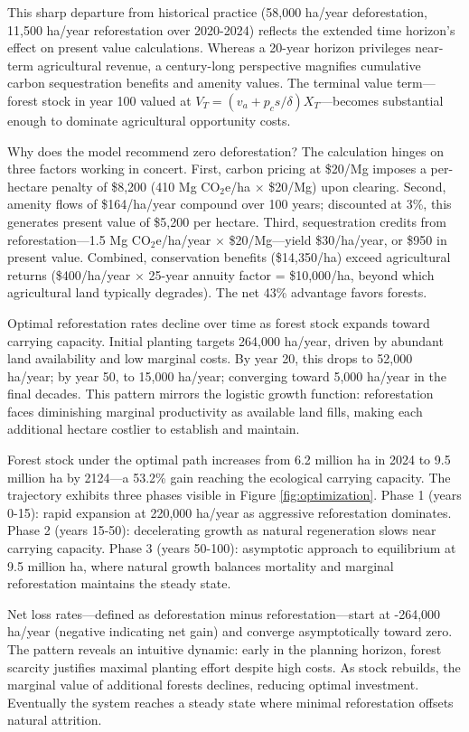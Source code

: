 This sharp departure from historical practice (58,000 ha/year deforestation, 11,500 ha/year reforestation over 2020-2024) reflects the extended time horizon's effect on present value calculations. Whereas a 20-year horizon privileges near-term agricultural revenue, a century-long perspective magnifies cumulative carbon sequestration benefits and amenity values. The terminal value term—forest stock in year 100 valued at $V_T = (v_a + p_c s / \delta) X_T$—becomes substantial enough to dominate agricultural opportunity costs.

Why does the model recommend zero deforestation? The calculation hinges on three factors working in concert. First, carbon pricing at \$20/Mg imposes a per-hectare penalty of \$8,200 (410 Mg CO$_2$e/ha $\times$ \$20/Mg) upon clearing. Second, amenity flows of \$164/ha/year compound over 100 years; discounted at 3\%, this generates present value of \$5,200 per hectare. Third, sequestration credits from reforestation—1.5 Mg CO$_2$e/ha/year $\times$ \$20/Mg—yield \$30/ha/year, or \$950 in present value. Combined, conservation benefits (\$14,350/ha) exceed agricultural returns (\$400/ha/year $\times$ 25-year annuity factor = \$10,000/ha, beyond which agricultural land typically degrades). The net 43\% advantage favors forests.

Optimal reforestation rates decline over time as forest stock expands toward carrying capacity. Initial planting targets 264,000 ha/year, driven by abundant land availability and low marginal costs. By year 20, this drops to 52,000 ha/year; by year 50, to 15,000 ha/year; converging toward 5,000 ha/year in the final decades. This pattern mirrors the logistic growth function: reforestation faces diminishing marginal productivity as available land fills, making each additional hectare costlier to establish and maintain.

Forest stock under the optimal path increases from 6.2 million ha in 2024 to 9.5 million ha by 2124—a 53.2\% gain reaching the ecological carrying capacity. The trajectory exhibits three phases visible in Figure \ref{fig:optimization}. Phase 1 (years 0-15): rapid expansion at 220,000 ha/year as aggressive reforestation dominates. Phase 2 (years 15-50): decelerating growth as natural regeneration slows near carrying capacity. Phase 3 (years 50-100): asymptotic approach to equilibrium at 9.5 million ha, where natural growth balances mortality and marginal reforestation maintains the steady state.

Net loss rates—defined as deforestation minus reforestation—start at -264,000 ha/year (negative indicating net gain) and converge asymptotically toward zero. The pattern reveals an intuitive dynamic: early in the planning horizon, forest scarcity justifies maximal planting effort despite high costs. As stock rebuilds, the marginal value of additional forests declines, reducing optimal investment. Eventually the system reaches a steady state where minimal reforestation offsets natural attrition.

